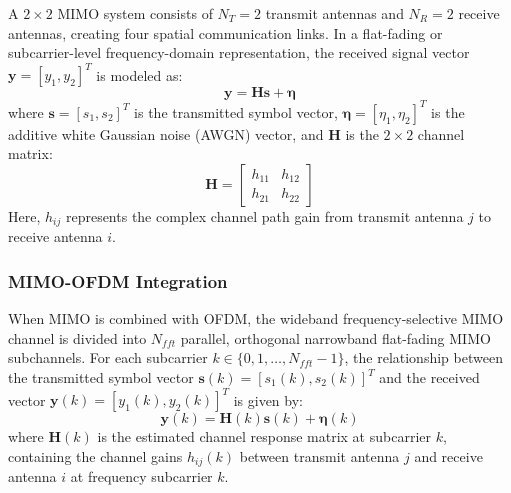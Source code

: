 \documentclass[a4paper]{article}
\begin{document}
A $2 \times 2$ MIMO system consists of $N_T = 2$ transmit antennas and $N_R = 2$ receive antennas, creating four spatial communication links. In a flat-fading or subcarrier-level frequency-domain representation, the received signal vector $\mathbf{y} = [y_1, y_2]^T$ is modeled as:
\begin{equation}
\mathbf{y} = \mathbf{H}\mathbf{s} + \boldsymbol{\eta}
\end{equation}
where $\mathbf{s} = [s_1, s_2]^T$ is the transmitted symbol vector, $\boldsymbol{\eta} = [\eta_1, \eta_2]^T$ is the additive white Gaussian noise (AWGN) vector, and $\mathbf{H}$ is the $2 \times 2$ channel matrix:
\begin{equation}
\mathbf{H} = \begin{bmatrix}
h_{11} & h_{12} \\
h_{21} & h_{22}
\end{bmatrix}
\end{equation}
Here, $h_{ij}$ represents the complex channel path gain from transmit antenna $j$ to receive antenna $i$.

\subsubsection{MIMO-OFDM Integration}
When MIMO is combined with OFDM, the wideband frequency-selective MIMO channel is divided into $N_{fft}$ parallel, orthogonal narrowband flat-fading MIMO subchannels. For each subcarrier $k \in \{0, 1, \dots, N_{fft}-1\}$, the relationship between the transmitted symbol vector $\mathbf{s}(k) = [s_1(k), s_2(k)]^T$ and the received vector $\mathbf{y}(k) = [y_1(k), y_2(k)]^T$ is given by:
\begin{equation}
\mathbf{y}(k) = \mathbf{H}(k)\mathbf{s}(k) + \boldsymbol{\eta}(k)
\end{equation}
where $\mathbf{H}(k)$ is the estimated channel response matrix at subcarrier $k$, containing the channel gains $h_{ij}(k)$ between transmit antenna $j$ and receive antenna $i$ at frequency subcarrier $k$.
\end{document}
